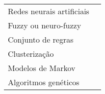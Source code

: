 \begin{tabular}{p{140pt}p{280pt}}
    \toprule
    Redes neurais artificiais &
    \cite{Papaloukas2001, Rocha2010, Afsar2007, Couceiro2008, Gopalakrishnan2004, Mohebbi2007, Pang2005, Stamkopoulos1997, Maglaveras1998}\\
    Fuzzy ou neuro-fuzzy &
    \cite{Exarchos2007, Vila1997}\\
    Conjunto de regras &
    \cite{Akselrod1987, Exarchos2006, Papaloukas2002}\\
    Clusterização &
    \cite{Badilini1992}\\
    Modelos de Markov &
    \cite{Andreao2004}\\
    Algoritmos genéticos &
    \cite{Goletsis2004}\\
    \bottomrule
\end{tabular}